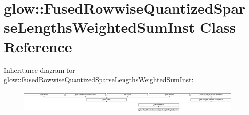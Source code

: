 \hypertarget{classglow_1_1_fused_rowwise_quantized_sparse_lengths_weighted_sum_inst}{}\section{glow\+:\+:Fused\+Rowwise\+Quantized\+Sparse\+Lengths\+Weighted\+Sum\+Inst Class Reference}
\label{classglow_1_1_fused_rowwise_quantized_sparse_lengths_weighted_sum_inst}
Inheritance diagram for glow\+:\+:Fused\+Rowwise\+Quantized\+Sparse\+Lengths\+Weighted\+Sum\+Inst\+:\begin{figure}[H]
\begin{center}
\leavevmode
\includegraphics[height=1.204301cm]{classglow_1_1_fused_rowwise_quantized_sparse_lengths_weighted_sum_inst}
\end{center}
\end{figure}
